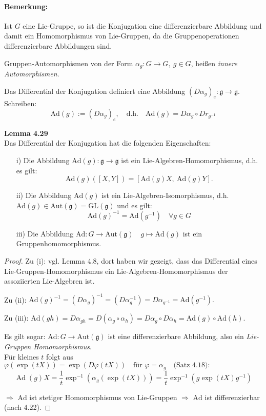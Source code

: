 \documentclass[fleqn, 12pt, letterpaper]{article}
\begin{document}
\paragraph{Bemerkung:}
Ist $G$ eine Lie-Gruppe, so ist die Konjugation eine differenzierbare Abbildung und damit ein Homomorphismus von Lie-Gruppen, da die Gruppenoperationen differenzierbare Abbildungen sind.

Gruppen-Automorphismen von der Form $\alpha_g \colon G \to G,\ g \in G$, heißen \emph{innere Automorphismen}.

Das Differential der Konjugation definiert eine Abbildung $(D\alpha_g)_e \colon \mathfrak{g} \to \mathfrak{g}$. Schreiben:
\[
\mathrm{Ad}(g) := (D\alpha_g)_e, \quad \text{d.h.} \quad \mathrm{Ad}(g) = D\alpha_g \circ Dr_{g^{-1}}
\]

\textbf{Lemma 4.29}\\
Das Differential der Konjugation hat die folgenden Eigenschaften:
\begin{itemize}
    \item[i)] Die Abbildung $\mathrm{Ad}(g) \colon \mathfrak{g} \to \mathfrak{g}$ ist ein Lie-Algebren-Homomorphismus, d.h. es gilt:
    \[
    \mathrm{Ad}(g)([X, Y]) = [\mathrm{Ad}(g)X,\ \mathrm{Ad}(g)Y].
    \]

    \item[ii)] Die Abbildung $\mathrm{Ad}(g)$ ist ein Lie-Algebren-Isomorphismus, d.h. $\mathrm{Ad}(g) \in \mathrm{Aut}(\mathfrak{g}) = \mathrm{GL}(\mathfrak{g})$ und es gilt: 
    \[\mathrm{Ad}(g)^{-1} = \mathrm{Ad}(g^{-1}) \quad\forall g \in G
    \]
    
    \item[iii)] Die Abbildung $\mathrm{Ad} \colon G \to \mathrm{Aut}(\mathfrak{g})\quad g\mapsto \mathrm{Ad}(g)$ ist ein Gruppenhomomorphismus.
\end{itemize}

\begin{proof}
    Zu (i): vgl. Lemma 4.8, dort haben wir gezeigt, dass das Differential eines Lie-Gruppen-Homomorphismus ein Lie-Algebren-Homomorphismus der assoziierten Lie-Algebren ist.

\medskip
Zu (ii):
\(
\mathrm{Ad}(g)^{-1} = (D\alpha_{g})^{-1} = (D\alpha_g^{-1}) = D\alpha_{g^{-1}} = \mathrm{Ad}(g^{-1}).
\)

\medskip
Zu (iii):
\(
\mathrm{Ad}(gh) = D\alpha_{gh} = D(\alpha_g \circ \alpha_h) = D\alpha_g \circ D\alpha_h = \mathrm{Ad}(g) \circ \mathrm{Ad}(h).
\)

\medskip
Es gilt sogar: $\mathrm{Ad} \colon G \to \mathrm{Aut}(\mathfrak{g})$ ist eine differenzierbare Abbildung, also ein \emph{Lie-Gruppen Homomorphismus}.\\

Für kleines $t$ folgt aus
\(
\varphi(\exp(tX)) = \exp(D\varphi(tX)) \quad \text{für } \varphi = \alpha_g \quad \text{(Satz 4.18)}:
\)
\[
\operatorname{Ad}(g)X = \frac{1}{t} \exp^{-1} \left( \alpha_g \left( \exp(tX) \right) \right) 
= \frac{1}{t} \exp^{-1} \left( g \exp(tX) g^{-1} \right)
\]

$\Rightarrow$ \quad $\mathrm{Ad}$ ist stetiger Homomorphismus von Lie-Gruppen $\Rightarrow$ $\mathrm{Ad}$ ist differenzierbar (nach 4.22).
\end{proof}
\end{document}
